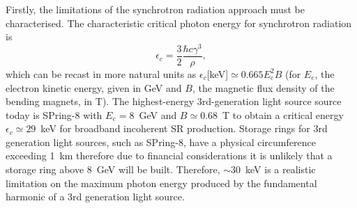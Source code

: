 \documentclass[../main.tex]{subfiles}
\begin{document}
Firstly, the limitations of the synchrotron radiation approach must be characterised. The characteristic critical photon energy for synchrotron radiation is
\begin{equation}
\epsilon_{c}=\frac{3}{2}\frac{\hbar c \gamma^3}{\rho},
\label{eq:synchrotron_critical_energy}
\end{equation}
which can be recast in more natural units as $\epsilon_{c}$[\si{\kilo\electronvolt}]$\simeq 0.665E_{e}^{2}B$ (for $E_{e}$, the electron kinetic energy, given in \si{\giga\electronvolt} and $B$, the magnetic flux density of the bending magnets, in \si{\tesla}). The highest-energy 3rd-generation light source source today is SPring-8 with $E_{e} = 8$~\si{\giga\electronvolt} and $B\simeq 0.68$~\si{\tesla} to obtain a critical energy $\epsilon_{c}\simeq 29$~\si{\kilo\electronvolt} for broadband incoherent SR production. Storage rings for 3rd generation light sources, such as SPring-8, have a physical circumference exceeding 1~\si{\kilo\meter} therefore due to financial considerations it is unlikely that a storage ring above 8~\si{\giga\electronvolt} will be built. Therefore, $\sim30$~\si{\kilo\electronvolt} is a realistic limitation on the maximum photon energy produced by the fundamental harmonic of a 3rd generation light source.
\end{document}
